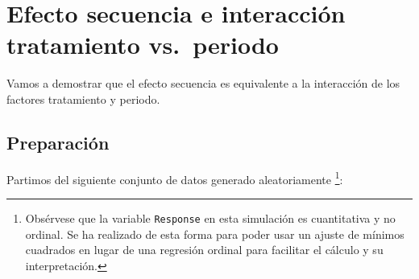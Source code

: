 \documentclass[
  12pt,
  a4paper,
  extrafontsizes,
  onecolumn,
  openright,
  table]{memoir}
\newenvironment{Shaded}{\begin{snugshade}}{\end{snugshade}}
\newcommand{\AttributeTok}[1]{\textcolor[rgb]{0.40,0.45,0.13}{#1}}
\newcommand{\ConstantTok}[1]{\textcolor[rgb]{0.56,0.35,0.01}{#1}}
\newcommand{\DecValTok}[1]{\textcolor[rgb]{0.68,0.00,0.00}{#1}}
\newcommand{\FunctionTok}[1]{\textcolor[rgb]{0.28,0.35,0.67}{#1}}
\newcommand{\NormalTok}[1]{\textcolor[rgb]{0.00,0.23,0.31}{#1}}
\newcommand{\OtherTok}[1]{\textcolor[rgb]{0.00,0.23,0.31}{#1}}
\newcommand{\SpecialCharTok}[1]{\textcolor[rgb]{0.37,0.37,0.37}{#1}}
\newcommand{\StringTok}[1]{\textcolor[rgb]{0.13,0.47,0.30}{#1}}
\begin{document}

\printbibliography[heading=none]

\cleardoublepage
{}
{}
\appendix

\hypertarget{sec-contrasts}{%
\chapter{Efecto secuencia e interacción tratamiento
vs.~periodo}\label{sec-contrasts}}

Vamos a demostrar que el efecto secuencia es equivalente a la
interacción de los factores tratamiento y periodo.

\hypertarget{preparaciuxf3n}{%
\section{Preparación}\label{preparaciuxf3n}}

Partimos del siguiente conjunto de datos generado aleatoriamente
\footnote{Obsérvese que la variable \texttt{Response} en esta simulación
  es cuantitativa y no ordinal. Se ha realizado de esta forma para poder
  usar un ajuste de mínimos cuadrados en lugar de una regresión ordinal
  para facilitar el cálculo y su interpretación.}: \scriptsize

\begin{Shaded}
\end{Shaded}
\end{document}
